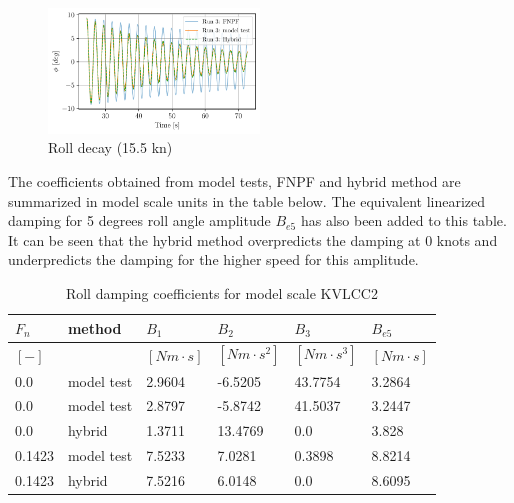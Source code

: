     \begin{figure}[H]
        \begin{center}\includegraphics[width = 0.5\textwidth]{figures/hybrid_speed_time.pdf}\end{center}
        \vspace{-1cm}
        \caption{Roll decay (15.5 kn)}
        \label{fig:hybrid_speed_time}
    \end{figure}
    
    The coefficients obtained from model tests, FNPF and hybrid method are
summarized in model scale units in the table below. The equivalent
linearized damping for 5 degrees roll angle amplitude $B_{e5}$ has
also been added to this table. It can be seen that the hybrid method
overpredicts the damping at 0 knots and underpredicts the damping for
the higher speed for this amplitude.
 
            
    
    
\begin{table}[H]
\scriptsize
\center
\caption{Roll damping coefficients for model scale KVLCC2}
\label{tab:results}
\begin{tabular}{l||l||l||l||l||l|}
\toprule\addlinespace
$F_n$ & method & $B_1$ & $B_2$ & $B_3$ & $B_{e5}$\\ 
\midrule$[-]$ &  & $[Nm \cdot s]$ & $[Nm \cdot s^2]$ & $[Nm \cdot s^3]$ & $[Nm \cdot s]$\\ 
0.0 & model test & 2.9604 & -6.5205 & 43.7754 & 3.2864\\ 
0.0 & model test & 2.8797 & -5.8742 & 41.5037 & 3.2447\\ 
0.0 & hybrid & 1.3711 & 13.4769 & 0.0 & 3.828\\ 
0.1423 & model test & 7.5233 & 7.0281 & 0.3898 & 8.8214\\ 
0.1423 & hybrid & 7.5216 & 6.0148 & 0.0 & 8.6095\\ 

\bottomrule
\end{tabular}
\end{table}

    

    